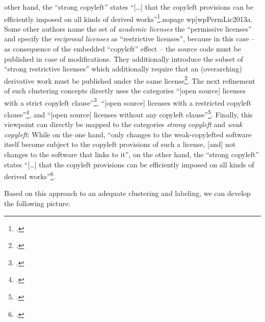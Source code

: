 other hand, the \enquote{strong copyleft} states \enquote{[\ldots] that the
copyleft provisions can be efficiently imposed on all kinds of derived
works}\footcite[cf.][\nopage wp]{wpCopyleft2013a}.nopage wp]{wpPermLic2013a}. Some other authors name
the set of \emph{academic licenses} the \enquote{permissive licenses} and
specify the \emph{reciprocal licenses} as \enquote{restrictive licenses},
because in this case -- as consequence of the embedded \enquote{copyleft} effect
-- the source code must be published in case of modifications. They additionally
introduce the subset of \enquote{strong restrictive licenses} which additionally
require that an (overarching) derivative work must be published under the same
license\footcite[pars pro toto cf.][57]{Buchtala2007a}. The next refinement of
such clustering concepts directly uses the categories \enquote{[open source]
licenses with a strict copyleft clause}\footcite[Originally stated as
\enquote{Lizenzen mit einer strengen Copyleft-Klausel}. Cf.][24]{JaeMet2011a},
\enquote{[open source] licenses with a restricted copyleft
clause}\footcite[Originally stated as \enquote{Lizenzen mit einer beschränkten
Copyleft-Klausel}. Cf.][71]{JaeMet2011a}, and \enquote{[open source] licenses
without any copyleft clause}\footcite[Originally stated as \enquote{Lizenzen
ohne Copyleft-Klausel}. Cf.][83]{JaeMet2011a}. Finally, this viewpoint can
directly be mapped to the categories \emph{strong copyleft} and \emph{weak
copyleft}: While on the one hand, \enquote{only changes to the weak-copylefted
software itself become subject to the copyleft provisions of such a license,
[and] not changes to the software that links to it}, on the other hand, the
\enquote{strong copyleft} states \enquote{[\ldots] that the copyleft provisions
can be efficiently imposed on all kinds of derived works}\footcite[cf.][\nopage
wp]{wpCopyleft2013a}.

Based on this approach to an adequate clustering and labeling, we can develop
the following picture:

